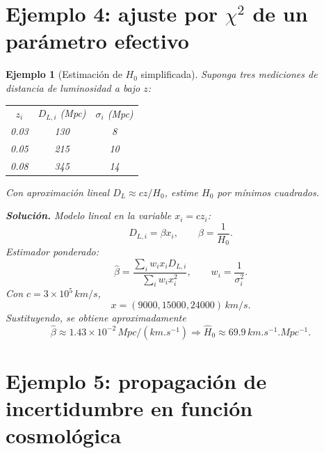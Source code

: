\documentclass[12pt,oneside]{book}
\newtheorem{ejemplo}{Ejemplo}[chapter]
\begin{document}
\section{Ejemplo 4: ajuste por $\chi^2$ de un parámetro efectivo}

\begin{ejemplo}[Estimación de $H_0$ simplificada]
Suponga tres mediciones de distancia de luminosidad a bajo $z$:
\begin{center}
\begin{tabular}{c c c}
$z_i$ & $D_{L,i}$ (Mpc) & $\sigma_i$ (Mpc)\\
0.03 & 130 & 8\\
0.05 & 215 & 10\\
0.08 & 345 & 14
\end{tabular}
\end{center}
Con aproximación lineal $D_L\approx cz/H_0$, estime $H_0$ por mínimos cuadrados.

\textbf{Solución.}
Modelo lineal en la variable $x_i=cz_i$:
\begin{equation}
  D_{L,i}=\beta x_i,\qquad \beta=\frac{1}{H_0}.
\end{equation}
Estimador ponderado:
\begin{equation}
  \hat\beta=\frac{\sum_i w_i x_i D_{L,i}}{\sum_i w_i x_i^2},\qquad w_i=\frac{1}{\sigma_i^2}.
\end{equation}
Con $c=3\times10^5\,\si{km/s}$,
\begin{equation}
  x=(9000,15000,24000)\,\si{km/s}.
\end{equation}
Sustituyendo, se obtiene aproximadamente
\begin{equation}
  \hat\beta\approx1.43\times10^{-2}\,\si{Mpc/(km.s^{-1})}
  \Rightarrow \hat H_0\approx69.9\,\si{km.s^{-1}.Mpc^{-1}}.
\end{equation}
\end{ejemplo}

\section{Ejemplo 5: propagación de incertidumbre en función cosmológica}
\end{document}
